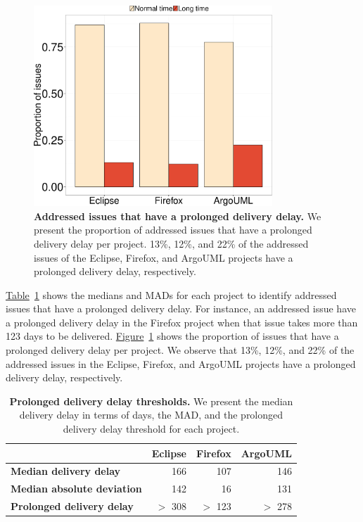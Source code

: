 \begin{figure}
	\centering
	\includegraphics[width=0.80\textwidth,keepaspectratio]
	{chapters/chapter4/figures/largelydelayed_issues_per_project.pdf}
	\caption{\textbf{Addressed issues that have a prolonged delivery delay.} We present
		the proportion of addressed issues that have a prolonged
		delivery delay per project. 13\%, 12\%, and 22\% of the addressed issues
		of the Eclipse, Firefox, and ArgoUML projects have a prolonged
		delivery delay, respectively.}
		\label{ch4:fig:largely_delayed_issues}
	\end{figure}

\hyperref[ch4:tbl:median_plus_mad]{Table}~\ref{ch4:tbl:median_plus_mad} shows
the medians and MADs for each project to identify addressed issues that have a
prolonged delivery delay. For instance, an addressed issue have a prolonged
delivery delay in the Firefox project when that issue takes more than 123 days
to be delivered.
\hyperref[ch4:fig:largely_delayed_issues]{Figure}~\ref{ch4:fig:largely_delayed_issues}
shows the proportion of issues that have a prolonged delivery delay per project.
We observe that 13\%, 12\%, and 22\% of the addressed issues in the Eclipse,
Firefox, and ArgoUML projects have a prolonged delivery delay, respectively. 

\begin{table}[t!]
	\footnotesize
	\centering
	\caption{\textbf{Prolonged delivery delay thresholds.} We present the median
	delivery delay in terms of days, the MAD, and the prolonged delivery delay threshold for each project.}
	\label{ch4:tbl:median_plus_mad}
	\begin{tabular}{lrrr}
		\cline{2-4} 
		\multicolumn{1}{c}{} & \textbf{Eclipse} & \textbf{Firefox} &
		\textbf{ArgoUML}\tabularnewline
		\hline 
		\textbf{Median delivery delay} & 166 & 107 & 146\tabularnewline
		\hline 
		\textbf{Median absolute deviation} & 142 & 16 & 131\tabularnewline
		\hline 
		\textbf{Prolonged delivery delay} & $>$ 308 & $>$ 123 & $>$ 278\tabularnewline
		\hline 
	\end{tabular}
\end{table}

